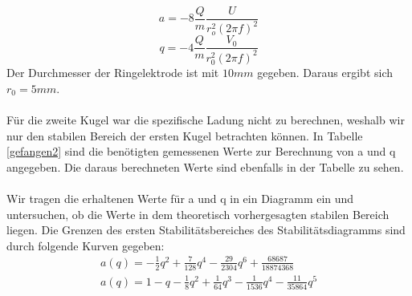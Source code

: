 \documentclass[10pt,a4paper]{article}
\begin{document}
\begin{equation}
	a = -8 \frac{Q}{m} \frac{U}{r_o^2 (2 \pi f)^2}
\end{equation}
\begin{equation}
	q = -4 \frac{Q}{m} \frac{V_0}{r_0^2 (2\pi f)^2}
\end{equation}
Der Durchmesser der Ringelektrode ist mit $10mm$ gegeben. Daraus ergibt sich $r_0 = 5mm$.\\\\Für die zweite Kugel war die spezifische Ladung nicht zu berechnen, weshalb wir nur den stabilen Bereich der ersten Kugel betrachten können. In Tabelle \ref{gefangen2} sind die benötigten gemessenen Werte zur Berechnung von a und q angegeben. Die daraus berechneten Werte sind ebenfalls in der Tabelle zu sehen. \\\\Wir tragen die erhaltenen Werte für a und q in ein Diagramm ein und untersuchen, ob die Werte in dem theoretisch vorhergesagten stabilen Bereich liegen. Die Grenzen des ersten Stabilitätsbereiches des Stabilitätsdiagramms sind durch folgende Kurven gegeben:
\begin{align}
	a(q) = - \frac{1}{2} q^2 + \frac{7}{128} q^4 - \frac{29}{2304} q^6 + \frac{68687}{18874368}\\
	a(q) = 1-q-\frac{1}{8} q^2 + \frac{1}{64} q^3 - \frac{1}{1536} q^4 - \frac{11}{35864} q^5	
\end{align}
\end{document}
